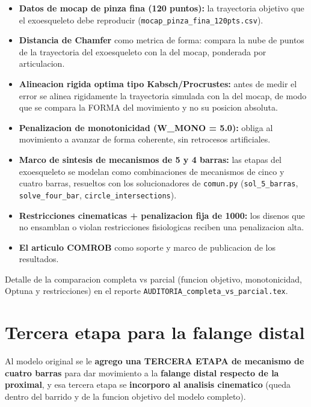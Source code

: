 \documentclass[11pt,a4paper]{article}
\begin{document}
\begin{itemize}[leftmargin=1.4em]
  \item \textbf{Datos de mocap de pinza fina (120 puntos):} la trayectoria
        objetivo que el exoesqueleto debe reproducir
        (\texttt{mocap\_pinza\_fina\_120pts.csv}).
  \item \textbf{Distancia de Chamfer} como metrica de forma: compara la nube de
        puntos de la trayectoria del exoesqueleto con la del mocap, ponderada por
        articulacion.
  \item \textbf{Alineacion rigida optima tipo Kabsch/Procrustes:} antes de medir
        el error se alinea rigidamente la trayectoria simulada con la del mocap,
        de modo que se compara la FORMA del movimiento y no su posicion absoluta.
  \item \textbf{Penalizacion de monotonicidad (W\_MONO = 5.0):} obliga al
        movimiento a avanzar de forma coherente, sin retrocesos artificiales.
  \item \textbf{Marco de sintesis de mecanismos de 5 y 4 barras:} las etapas del
        exoesqueleto se modelan como combinaciones de mecanismos de cinco y
        cuatro barras, resueltos con los solucionadores de \texttt{comun.py}
        (\texttt{sol\_5\_barras}, \texttt{solve\_four\_bar},
        \texttt{circle\_intersections}).
  \item \textbf{Restricciones cinematicas + penalizacion fija de 1000:} los
        disenos que no ensamblan o violan restricciones fisiologicas reciben una
        penalizacion alta.
  \item \textbf{El articulo COMROB} como soporte y marco de publicacion de los
        resultados.
\end{itemize}

Detalle de la comparacion completa vs parcial (funcion objetivo, monotonicidad,
Optuna y restricciones) en el reporte
\texttt{AUDITORIA\_completa\_vs\_parcial.tex}.

\section{Tercera etapa para la falange distal}

Al modelo original se le \textbf{agrego una TERCERA ETAPA de mecanismo de cuatro
barras} para dar movimiento a la \textbf{falange distal respecto de la proximal},
y esa tercera etapa se \textbf{incorporo al analisis cinematico} (queda dentro
del barrido y de la funcion objetivo del modelo completo).
\end{document}

